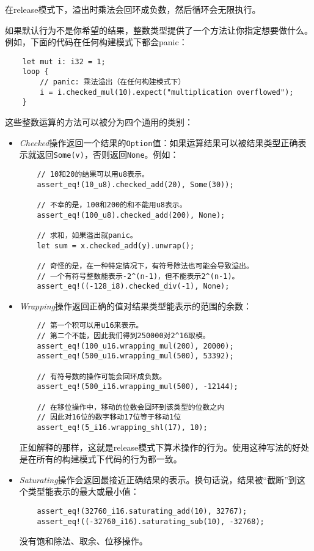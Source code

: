 在release模式下，溢出时乘法会回环成负数，然后循环会无限执行。

如果默认行为不是你希望的结果，整数类型提供了一个方法让你指定想要做什么。例如，下面的代码在任何构建模式下都会panic：
\begin{verbatim}
    let mut i: i32 = 1;
    loop {
        // panic: 乘法溢出（在任何构建模式下）
        i = i.checked_mul(10).expect("multiplication overflowed");
    }
\end{verbatim}

这些整数运算的方法可以被分为四个通用的类别：
\begin{itemize}
    \item \emph{Checked}操作返回一个结果的\texttt{Option}值：如果运算结果可以被结果类型正确表示就返回\texttt{Some(v)}，否则返回\texttt{None}。例如：
    \begin{verbatim}
    // 10和20的结果可以用u8表示。
    assert_eq!(10_u8).checked_add(20), Some(30));

    // 不幸的是，100和200的和不能用u8表示。
    assert_eq!(100_u8).checked_add(200), None);

    // 求和，如果溢出就panic。
    let sum = x.checked_add(y).unwrap();

    // 奇怪的是，在一种特定情况下，有符号除法也可能会导致溢出。
    // 一个有符号整数能表示-2^(n-1)，但不能表示2^(n-1)。
    assert_eq!((-128_i8).checked_div(-1), None);
    \end{verbatim}

    \item \emph{Wrapping}操作返回正确的值对结果类型能表示的范围的余数：
    \begin{verbatim}
    // 第一个积可以用u16来表示。
    // 第二个不能，因此我们得到250000对2^16取模。
    assert_eq!(100_u16.wrapping_mul(200), 20000);
    assert_eq!(500_u16.wrapping_mul(500), 53392);

    // 有符号数的操作可能会回环成负数。
    assert_eq!(500_i16.wrapping_mul(500), -12144);

    // 在移位操作中，移动的位数会回环到该类型的位数之内
    // 因此对16位的数字移动17位等于移动1位
    assert_eq!(5_i16.wrapping_shl(17), 10);
    \end{verbatim}
    正如解释的那样，这就是release模式下算术操作的行为。使用这种写法的好处是在所有的构建模式下代码的行为都一致。

    \item \emph{Saturating}操作会返回最接近正确结果的表示。换句话说，结果被“截断”到这个类型能表示的最大或最小值：
    \begin{verbatim}
    assert_eq!(32760_i16.saturating_add(10), 32767);
    assert_eq!((-32760_i16).saturating_sub(10), -32768);
    \end{verbatim}
    没有饱和除法、取余、位移操作。


\end{itemize}
